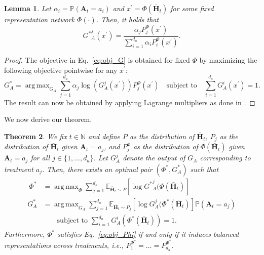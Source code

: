 \documentclass{article}
\theoremstyle{plain}
\newtheorem{theorem}{Theorem}[section]
\newtheorem{lemma}[theorem]{Lemma}
\theoremstyle{definition}
\theoremstyle{remark}
\DeclareMathOperator*{\argmax}{arg\,max}
\begin{document}
\begin{lemma}\label{lem:sol_G}
Let $\alpha_i = \mathbb{P}(\mathbf{A}_t = a_i)$ and $x^\prime = \Phi(\bar{\mathbf{H}}_t)$ for some fixed representation network $\Phi(\cdot)$. Then, it holds that
\begin{equation}\label{eq:sol_G}
    {G^\ast}^j_A(x^\prime) =  \frac{\alpha_j P^\Phi_j(x^\prime)}{\sum_{i=1}^{d_a}\alpha_i P^\Phi_i(x^\prime)}.
\end{equation}
\end{lemma}
\begin{proof}
The objective in Eq.~\eqref{eq:obj_G} is obtained for fixed $\Phi$ by maximizing the following objective pointwise for any $x^\prime$:
\begin{equation}
     G^\ast_A = \argmax_{G_A} \sum_{j=1}^{d_a} \alpha_j \log\left({G}^j_A(x^\prime) \right) P^\Phi_j(x^\prime) \quad \text{subject to} \quad  \sum_{i=1}^{d_a} {G}^i_A(x^\prime) = 1.
\end{equation}
The result can now be obtained by applying Lagrange multipliers as done in \cite{bica2020estimating}.
\end{proof}

We now derive our theorem.

\begin{theorem}\label{thrm:domain_conf_loss}
We fix $t \in \mathbb{N}$ and define $P$ as the distribution of $\bar{\mathbf{H}}_t$, $P_j$ as the distribution of $\bar{\mathbf{H}}_t$ given $\mathbf{A}_t = a_j$, and $P^\Phi_j$ as the distribution of $\Phi(\bar{\mathbf{H}}_t)$ given $\mathbf{A}_t = a_j$ for all $j \in \{1, \dots, d_a\}$. Let $G^j_A$ denote the output of $G_A$ corresponding to treatment $a_j$. Then, there exists an optimal pair $(\Phi^\ast, G^\ast_A)$ such that
\begin{align}\
 \Phi^\ast &= \argmax_{\Phi} \sum_{j=1}^{d_a} \mathbb{E}_{\bar{\mathbf{H}}_t \sim P}\left[ \log{G^\ast}^j_A(\Phi(\bar{\mathbf{H}}_t) \right]\label{eq:obj_Phi} \\
 G^\ast_A &= \argmax_{G_A} \sum_{j=1}^{d_a} \mathbb{E}_{\bar{\mathbf{H}}_t \sim P_j}\left[\log{G}^j_A(\Phi^\ast(\bar{\mathbf{H}}_t) \right] \mathbb{P}(\mathbf{A}_t = a_j) \label{eq:obj_G}\\
& \quad \quad \text{subject to }  \sum_{i=1}^{d_a} {G}^i_A(\Phi^\ast(\bar{\mathbf{H}}_t)) = 1.
\end{align}
Furthermore, $\Phi^\ast$ satisfies Eq.~\eqref{eq:obj_Phi} if and only if it induces balanced representations across treatments, i.e., $P^{\Phi^\ast}_1 = \ldots = P^{\Phi^\ast}_{d_a}$.
\end{theorem}
\end{document}
